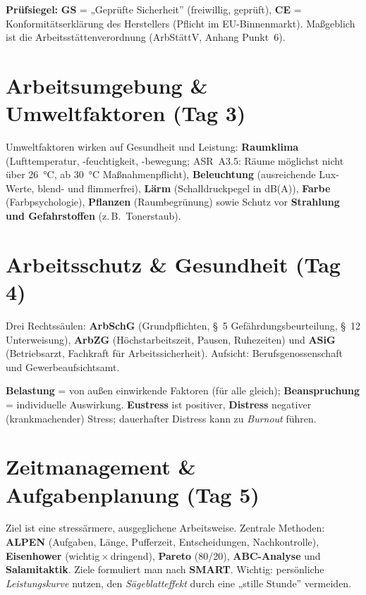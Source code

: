 \documentclass[11pt, a4paper]{article}
\begin{document}
\begin{eselsbruecke}
\textbf{Prüfsiegel:} \textbf{GS} = „Geprüfte Sicherheit'' (freiwillig, geprüft),
\textbf{CE} = Konformitätserklärung des Herstellers (Pflicht im EU-Binnenmarkt).
Maßgeblich ist die Arbeitsstättenverordnung (ArbStättV, Anhang Punkt~6).
\end{eselsbruecke}

\section{Arbeitsumgebung \& Umweltfaktoren (Tag 3)}

Umweltfaktoren wirken auf Gesundheit und Leistung: \textbf{Raumklima} (Lufttemperatur,
-feuchtigkeit, -bewegung; ASR~A3.5: Räume möglichst nicht über 26~°C,
ab 30~°C Maßnahmenpflicht), \textbf{Beleuchtung} (ausreichende
Lux-Werte, blend- und flimmerfrei), \textbf{Lärm} (Schalldruckpegel in dB(A)),
\textbf{Farbe} (Farbpsychologie), \textbf{Pflanzen} (Raumbegrünung) sowie Schutz vor
\textbf{Strahlung und Gefahrstoffen} (z.\,B.\ Tonerstaub).

\section{Arbeitsschutz \& Gesundheit (Tag 4)}

Drei Rechtssäulen: \textbf{ArbSchG} (Grundpflichten, \S~5 Gefährdungsbeurteilung,
\S~12 Unterweisung), \textbf{ArbZG} (Höchstarbeitszeit, Pausen, Ruhezeiten) und
\textbf{ASiG} (Betriebsarzt, Fachkraft für Arbeitssicherheit). Aufsicht: Berufs\-genossenschaft
und Gewerbeaufsichtsamt.

\begin{merksatz}
\textbf{Belastung} = von außen einwirkende Faktoren (für alle gleich); \textbf{Beanspruchung}
= individuelle Auswirkung. \textbf{Eustress} ist positiver, \textbf{Distress} negativer
(krankmachender) Stress; dauerhafter Distress kann zu \emph{Burnout} führen.
\end{merksatz}

\section{Zeitmanagement \& Aufgabenplanung (Tag 5)}

Ziel ist eine stressärmere, ausgeglichene Arbeitsweise. Zentrale Methoden:
\textbf{ALPEN} (Aufgaben, Länge, Pufferzeit, Entscheidungen, Nachkontrolle),
\textbf{Eisenhower} (wichtig\,$\times$\,dringend), \textbf{Pareto} (80/20),
\textbf{ABC-Analyse} und \textbf{Salamitaktik}. Ziele formuliert man nach \textbf{SMART}.
Wichtig: persönliche \emph{Leistungskurve} nutzen, den \emph{Sägeblatteffekt} durch eine
„stille Stunde'' vermeiden.
\end{document}

